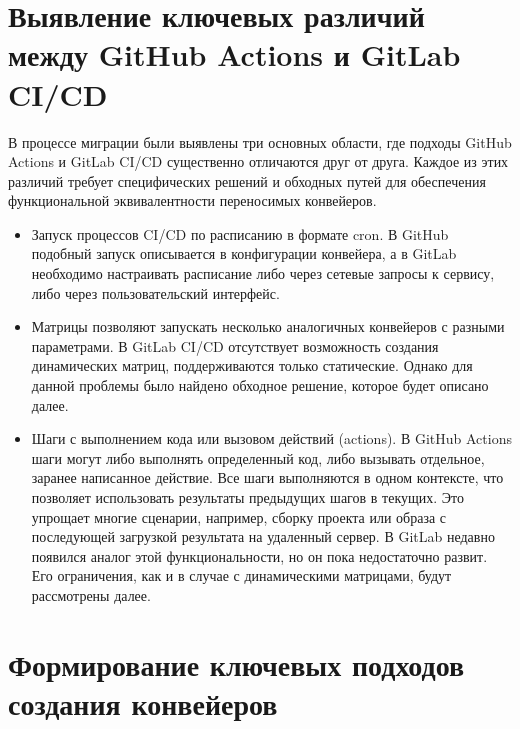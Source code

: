 \section{Выявление ключевых различий между GitHub Actions и GitLab CI/CD} \label{sec:gh-and-gl-differences}
В процессе миграции были выявлены три основных области, где подходы GitHub Actions и GitLab CI/CD существенно отличаются друг от друга.
Каждое из этих различий требует специфических решений и обходных путей для обеспечения функциональной эквивалентности переносимых конвейеров.
\begin{itemize}
  \item Запуск процессов CI/CD по расписанию в формате cron.
        В GitHub подобный запуск описывается в конфигурации конвейера,
        а в GitLab необходимо настраивать расписание либо через сетевые запросы к сервису,
        либо через пользовательский интерфейс.
  \item Матрицы позволяют запускать несколько аналогичных конвейеров с разными параметрами.
        В GitLab CI/CD отсутствует возможность создания динамических матриц, поддерживаются только статические.
        Однако для данной проблемы было найдено обходное решение, которое будет описано далее.
  \item Шаги с выполнением кода или вызовом действий (actions).
        В GitHub Actions шаги могут либо выполнять определенный код, либо вызывать отдельное, заранее написанное действие.
        Все шаги выполняются в одном контексте, что позволяет использовать результаты предыдущих шагов в текущих.
        Это упрощает многие сценарии, например, сборку проекта или образа с последующей загрузкой результата на удаленный сервер.
        В GitLab недавно появился аналог этой функциональности, но он пока недостаточно развит.
        Его ограничения, как и в случае с динамическими матрицами, будут рассмотрены далее.
\end{itemize}

\section{Формирование ключевых подходов создания конвейеров} \label{sec:gitlab-pipelines-key-principles}
